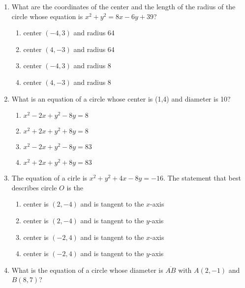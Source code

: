 \documentclass[12pt, twoside]{article}
\begin{document}
\begin{enumerate}
\newpage
\item %
  What are the coordinates of the center and the length of the radius of the circle whose equation is $x^2+y^2=8x-6y+39$?
    \begin{enumerate}
      \item center $(-4,3)$ and radius 64
      \item center $(4,-3)$ and radius 64
      \item center $(-4,3)$ and radius 8
      \item center $(4,-3)$ and radius 8
    \end{enumerate}

\item %
What is an equation of a circle whose center is (1,4) and diameter is 10?
  \begin{enumerate}
    \item $x^2-2x+y^2-8y=8$
    \item $x^2+2x+y^2+8y=8$
    \item $x^2-2x+y^2-8y=83$
    \item $x^2+2x+y^2+8y=83$
  \end{enumerate}    
     
\item %
  The equation of a cirle is $x^2+y^2+4x-8y=-16$. The statement that best describes circle $O$ is the
    \begin{enumerate}
      \item center is $(2,-4)$ and is tangent to the $x$-axis
      \item center is $(2,-4)$ and is tangent to the $y$-axis
      \item center is $(-2,4)$ and is tangent to the $x$-axis
      \item center is $(-2,4)$ and is tangent to the $y$-axis
    \end{enumerate}

\item What is the equation of a circle whose diameter is $\overline{AB}$ with $A(2,-1)$ and $B(8,7)$?
    \begin{flushright}
    \end{flushright}


\end{enumerate}
\end{document}

